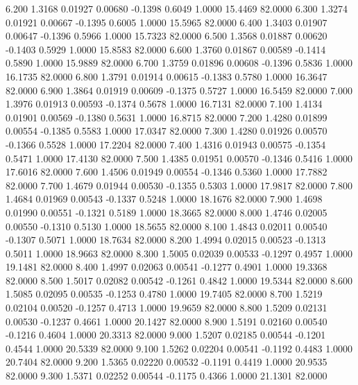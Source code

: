    6.200   1.3168   0.01927   0.00680  -0.1398   0.6049   1.0000  15.4469  82.0000
   6.300   1.3274   0.01921   0.00667  -0.1395   0.6005   1.0000  15.5965  82.0000
   6.400   1.3403   0.01907   0.00647  -0.1396   0.5966   1.0000  15.7323  82.0000
   6.500   1.3568   0.01887   0.00620  -0.1403   0.5929   1.0000  15.8583  82.0000
   6.600   1.3760   0.01867   0.00589  -0.1414   0.5890   1.0000  15.9889  82.0000
   6.700   1.3759   0.01896   0.00608  -0.1396   0.5836   1.0000  16.1735  82.0000
   6.800   1.3791   0.01914   0.00615  -0.1383   0.5780   1.0000  16.3647  82.0000
   6.900   1.3864   0.01919   0.00609  -0.1375   0.5727   1.0000  16.5459  82.0000
   7.000   1.3976   0.01913   0.00593  -0.1374   0.5678   1.0000  16.7131  82.0000
   7.100   1.4134   0.01901   0.00569  -0.1380   0.5631   1.0000  16.8715  82.0000
   7.200   1.4280   0.01899   0.00554  -0.1385   0.5583   1.0000  17.0347  82.0000
   7.300   1.4280   0.01926   0.00570  -0.1366   0.5528   1.0000  17.2204  82.0000
   7.400   1.4316   0.01943   0.00575  -0.1354   0.5471   1.0000  17.4130  82.0000
   7.500   1.4385   0.01951   0.00570  -0.1346   0.5416   1.0000  17.6016  82.0000
   7.600   1.4506   0.01949   0.00554  -0.1346   0.5360   1.0000  17.7882  82.0000
   7.700   1.4679   0.01944   0.00530  -0.1355   0.5303   1.0000  17.9817  82.0000
   7.800   1.4684   0.01969   0.00543  -0.1337   0.5248   1.0000  18.1676  82.0000
   7.900   1.4698   0.01990   0.00551  -0.1321   0.5189   1.0000  18.3665  82.0000
   8.000   1.4746   0.02005   0.00550  -0.1310   0.5130   1.0000  18.5655  82.0000
   8.100   1.4843   0.02011   0.00540  -0.1307   0.5071   1.0000  18.7634  82.0000
   8.200   1.4994   0.02015   0.00523  -0.1313   0.5011   1.0000  18.9663  82.0000
   8.300   1.5005   0.02039   0.00533  -0.1297   0.4957   1.0000  19.1481  82.0000
   8.400   1.4997   0.02063   0.00541  -0.1277   0.4901   1.0000  19.3368  82.0000
   8.500   1.5017   0.02082   0.00542  -0.1261   0.4842   1.0000  19.5344  82.0000
   8.600   1.5085   0.02095   0.00535  -0.1253   0.4780   1.0000  19.7405  82.0000
   8.700   1.5219   0.02104   0.00520  -0.1257   0.4713   1.0000  19.9659  82.0000
   8.800   1.5209   0.02131   0.00530  -0.1237   0.4661   1.0000  20.1427  82.0000
   8.900   1.5191   0.02160   0.00540  -0.1216   0.4604   1.0000  20.3313  82.0000
   9.000   1.5207   0.02185   0.00544  -0.1201   0.4544   1.0000  20.5339  82.0000
   9.100   1.5262   0.02204   0.00541  -0.1192   0.4483   1.0000  20.7404  82.0000
   9.200   1.5365   0.02220   0.00532  -0.1191   0.4419   1.0000  20.9535  82.0000
   9.300   1.5371   0.02252   0.00544  -0.1175   0.4366   1.0000  21.1301  82.0000
